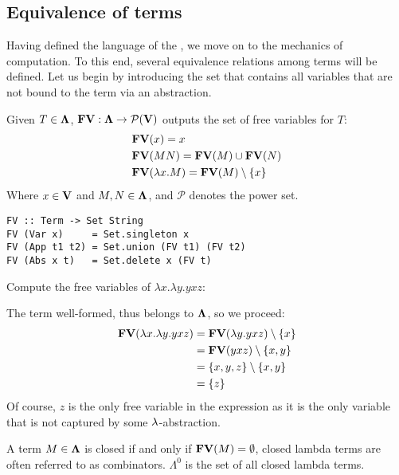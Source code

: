 \documentclass[12pt]{book}
\begin{document}
\subsection{\centering Equivalence of terms}
Having defined the language of the \lcalc, we move on to the mechanics of computation. To this end, several equivalence relations among terms will be defined. Let us begin by introducing the set that contains all variables that are not bound to the term via an abstraction.
\begin{definition} Given $T \in \mathbf{\Lambda} $, $\mathbf{FV} : \mathbf{\Lambda} \to \mathcal{P}(\mathbf{V}) $ outputs the set of free variables for $T$:
  \begin{align*}
    & \mathbf{FV}(x) = {x}\\
    & \mathbf{FV}(MN) = \mathbf{FV}(M) \cup \mathbf{FV}(N) \\
    & \mathbf{FV}(\lambda x . M) = \mathbf{FV}(M) \setminus \{x\}
  \end{align*}
  Where $ x \in \mathbf{V} $ and $ M, N \in \mathbf{\Lambda} $, and $\mathcal{P}$ denotes the power set.
  \begin{lstlisting}[style=haskellstyle,caption={Implementation of FVV in Haskell.}]
FV :: Term -> Set String
FV (Var x)     = Set.singleton x
FV (App t1 t2) = Set.union (FV t1) (FV t2)
FV (Abs x t)   = Set.delete x (FV t)
  \end{lstlisting}
\end{definition}
\begin{example}
  Compute the free variables of $\lambda x . \lambda y . y x z$:
  
  The term well-formed, thus belongs to $\mathbf{\Lambda}$, so we proceed:
  \begin{align*}
    \mathbf{FV}(\lambda x . \lambda y . y x z) &= \mathbf{FV}(\lambda y . yxz) \setminus \{x\} \\
                                        &= \mathbf{FV}(yxz) \setminus \{x, y\} \\
                                        &= \{x, y, z\} \setminus \{x, y\} \\
                                        &= \{z\}
  \end{align*}
  Of course, $z$ is the only free variable in the expression as it is the only variable that is not captured by some $\lambda$-abstraction.
\end{example}
\begin{definition}
  A term $M \in \mathbf{\Lambda}$ is closed if and only if $\mathbf{FV}(M) = \emptyset$, closed lambda terms are often referred to as combinators. $\Lambda^0$ is the set of all closed lambda terms.
\end{definition}
\end{document}
